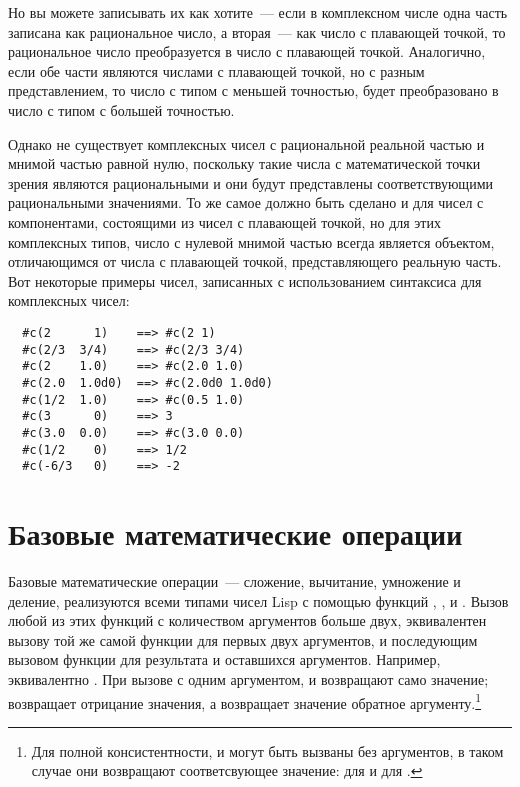 Но вы можете записывать их как хотите~--- если в комплексном числе одна часть записана как
рациональное число, а вторая~--- как число с плавающей точкой, то рациональное число
преобразуется в число с плавающей точкой.  Аналогично, если обе части являются числами с
плавающей точкой, но с разным представлением, то число с типом с меньшей точностью, будет
преобразовано в число с типом с большей точностью.

Однако не существует комплексных чисел с рациональной реальной частью и мнимой частью
равной нулю, поскольку такие числа с математической точки зрения являются рациональными и
они будут представлены соответствующими рациональными значениями. То же самое должно быть
сделано и для чисел с компонентами, состоящими из чисел с плавающей точкой, но для этих
комплексных типов, число с нулевой мнимой частью всегда является объектом, отличающимся от
числа с плавающей точкой, представляющего реальную часть.  Вот некоторые примеры чисел,
записанных с использованием синтаксиса для комплексных чисел:

\begin{verbatim}
  #c(2      1)    ==> #c(2 1)
  #c(2/3  3/4)    ==> #c(2/3 3/4)
  #c(2    1.0)    ==> #c(2.0 1.0)
  #c(2.0  1.0d0)  ==> #c(2.0d0 1.0d0)
  #c(1/2  1.0)    ==> #c(0.5 1.0)
  #c(3      0)    ==> 3
  #c(3.0  0.0)    ==> #c(3.0 0.0)
  #c(1/2    0)    ==> 1/2
  #c(-6/3   0)    ==> -2
\end{verbatim}

\section{Базовые математические операции}

Базовые математические операции~--- сложение, вычитание, умножение и деление, реализуются
всеми типами чисел Lisp с помощью функций \code{+}, \code{-}, \code{*} и \code{/}.  Вызов
любой из этих функций с количеством аргументов больше двух, эквивалентен вызову той же
самой функции для первых двух аргументов, и последующим вызовом функции для результата и
оставшихся аргументов.  Например,  эквивалентно .  При
вызове с одним аргументом, \code{+} и \code{*} возвращают само значение; \code{-}
возвращает отрицание значения, а \code{/} возвращает значение обратное
аргументу.\footnote{Для полной консистентности, \code{+} и \code{*} могут быть вызваны без
  аргументов, в таком случае они возвращают соответсвующее значение:  для \code{+}
  и  для \code{*}.}

